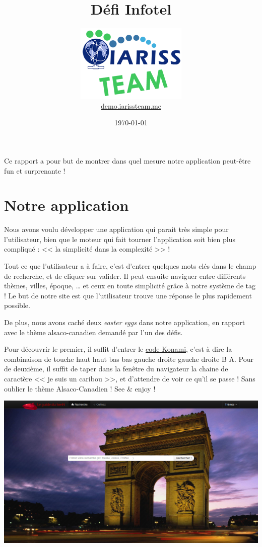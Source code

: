 \documentclass[12pt, a4paper]{article}
\title{Défi Infotel}
\newcommand{\espace}{\vspace{.8cm}}
\begin{document}
\author{\includegraphics{../_img/iariss_team.png} \\ {\sffamily \href{http://demo.iarissteam.me}{demo.iarissteam.me}}}
\date{\today}

\maketitle{}

{\sffamily Ce rapport a pour but de montrer dans quel mesure notre application peut-être fun et surprenante !} 

\espace{}
\section*{Notre application}
Nous avons voulu développer une application qui parait très simple pour l'utilisateur, bien que le moteur qui fait tourner l'application soit bien plus compliqué : << la simplicité dans la complexité >> !

Tout ce que l'utilisateur a à faire, c'est d'entrer quelques mots clés dans le champ de recherche, et de cliquer sur valider. Il peut ensuite naviguer entre différents thèmes, villes, époque, \ldots{} et ceux en toute simplicité grâce à notre système de tag ! Le but de notre site est que l'utilisateur trouve une réponse le plus rapidement possible.

\espace
De plus, nous avons caché deux \emph{easter eggs} dans notre application, en rapport avec le thème alsaco-canadien demandé par l'un des défis.

Pour découvrir le premier, il suffit d'entrer le \href{http://fr.wikipedia.org/wiki/Code_Konami}{code Konami}, c'est à dire la combinaison de touche haut haut bas bas gauche droite gauche droite B A.
Pour de deuxième, il suffit de taper dans la fenêtre du navigateur la chaine de caractère << je suis un caribou >>, et d'attendre de voir ce qu'il se passe !
Sans oublier le thème Alsaco-Canadien !
See \& enjoy !

\begin{center}
\includegraphics[width=.9\textwidth, keepaspectratio=true]{accueil.png}
\end{center}
\espace{}
\end{document}
